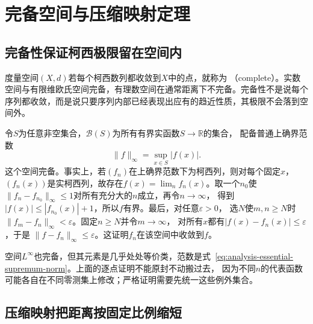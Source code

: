 \section{完备空间与压缩映射定理}
\label{sec:analysis-complete-contraction}
\subsection{完备性保证柯西极限留在空间内}

度量空间$(X,d)$若每个柯西数列都收敛到$X$中的点，就称为
（complete）。实数空间与有限维欧氏空间完备，有理数空间在通常距离下不完备。完备性不是说每个序列都收敛，而是说只要序列内部已经表现出应有的趋近性质，其极限不会落到空间外。

令$S$为任意非空集合，$\mathcal{B}(S)$为所有有界实函数$S\to\mathbb{R}$的集合， 配备普通上确界范数
\[   \lVert f\rVert_{\infty}   =   \sup_{x\in S}|f(x)|. \]
这个空间完备。事实上，若$(f_n)$在上确界范数下为柯西列，则对每个固定$x$， $(f_n(x))$是实柯西列，故存在$f(x)=\lim_n f_n(x)$。取一个$n_0$使 $\lVert f_n-f_{n_0}\rVert_\infty\leq1$对所有充分大的$n$成立，再令$n\to\infty$， 得到$|f(x)|\leq|f_{n_0}(x)|+1$，所以$f$有界。最后，对任意$\varepsilon>0$， 选$N$使$m,n\geq N$时 $\lVert f_m-f_n\rVert_\infty<\varepsilon$。固定$n\geq N$并令$m\to\infty$， 对所有$x$都有$|f(x)-f_n(x)|\leq\varepsilon$，于是 $\lVert f-f_n\rVert_\infty\leq\varepsilon$。这证明$f_n$在该空间中收敛到$f$。

空间$L^\infty$也完备，但其元素是几乎处处等价类，范数是式~\eqref{eq:analysis-essential-supremum-norm}。上面的逐点证明不能原封不动搬过去， 因为不同$n$的代表函数可能各自在不同零测集上修改；严格证明需要先统一这些例外集合。
\subsection{压缩映射把距离按固定比例缩短}

